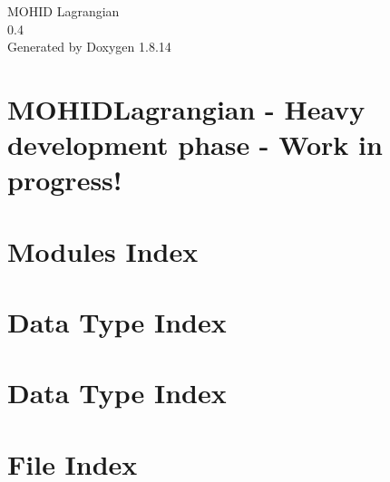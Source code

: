 \documentclass[twoside]{book}
\newcommand{\+}{\discretionary{\mbox{\scriptsize$\hookleftarrow$}}{}{}}
\newcommand{\clearemptydoublepage}{%
  \newpage{\pagestyle{empty}\cleardoublepage}%
}
\begin{document}
\hypersetup{pageanchor=false,
             bookmarksnumbered=true,
             pdfencoding=unicode
            }
\begin{titlepage}
\vspace*{7cm}
\begin{center}%
{\Large M\+O\+H\+ID Lagrangian \\[1ex]\large 0.\+4 }\\
\vspace*{1cm}
{\large Generated by Doxygen 1.8.14}\\
\end{center}
\end{titlepage}
\clearemptydoublepage
{}
\tableofcontents
\clearemptydoublepage
{}
\hypersetup{pageanchor=true}

\chapter{M\+O\+H\+I\+D\+Lagrangian -\/ Heavy development phase -\/ Work in progress!}
\label{index}\hypertarget{index}{}
\chapter{Modules Index}

\chapter{Data Type Index}

\chapter{Data Type Index}

\chapter{File Index}

\end{document}
